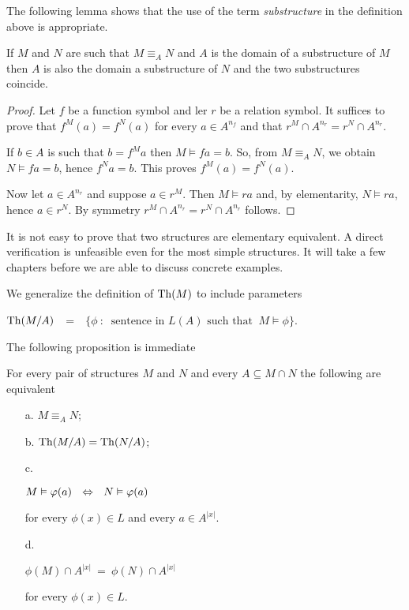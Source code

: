 The following lemma shows that the use of the term \textit{substructure\/} in the definition above is appropriate.

\begin{lemma}\label{eqelsubstructure}
If $M$ and $N$ are such that $M\equiv_AN$ and $A$ is the domain of a substructure of $M$ then $A$ is also the domain a substructure of $N$ and the two substructures coincide.
\end{lemma}
\begin{proof}
Let $f$ be a function symbol and ler $r$ be a relation symbol.
It suffices to prove that  
$f^M(a)=f^N(a)$ for every $a\in A^{n_f}$ and that $r^M\cap A^{n_r}=r^N\cap A^{n_r}$.

If $b\in A$ is such that $b=f^Ma$ then $M\models fa=b$.
So, from $M\equiv_AN$, we obtain $N\models fa=b$, hence $f^Na=b$.
This proves $f^M(a)=f^N(a)$.

Now let $a\in A^{n_r}$ and suppose $a\in r^M$.
Then $M\models ra$ and, by elementarity, $N\models ra$, hence $a\in r^N$.
By symmetry $r^M\cap A^{n_r}=r^N\cap A^{n_r}$ follows.
\end{proof}

It is not easy to prove that two structures are elementary equivalent.
A direct verification is unfeasible even for the most simple structures.
It will take a few chapters before we are able to discuss concrete examples.

We generalize the definition of ${\rm Th}(M)$ to include parameters 

\hfil\emph{${\rm Th}(M/A)$}\ \ =\ \ $\Big\{\phi\ :\ \textrm{ sentence in }L(A)\textrm{  such that }\  M\models\phi\Big\}$.

The following proposition is immediate

\begin{proposition}\label{equivalentielementareequivaleza}
For every pair of structures $M$ and $N$ and every $A\subseteq M\cap N$ the following are equivalent
\begin{itemize}
\item[a.] $M\equiv_A N$;
\item[b.] ${\rm Th}(M/A)={\rm Th}(N/A)$;
\item[c.] \parbox{27ex}{$M\vDash\varphi(a)\ \ \Leftrightarrow\ \ N\vDash \varphi(a)$}  for every $\phi(x)\in L$ and every $a\in A^{|x|}$.
\item[d.]  \parbox{27ex}{$\phi(M) \cap A^{|x|}\ =\ \phi(N) \cap A^{|x|}$} for every $\phi(x)\in L$.
\end{itemize}
\end{proposition}

